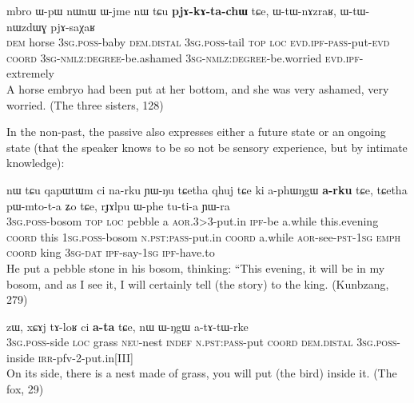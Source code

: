 \documentclass[oldfontcommands,oneside,a4paper,11pt]{memoir}
\newcommand{\ipa}[1]{{\phon #1}} %
\newcommand{\aor}{\textsc{aor}}
\newcommand{\coord}{\textsc{coord}}
\newcommand{\dat}{\textsc{dat}}
\newcommand{\dem}{\textsc{dem}}
\newcommand{\emphat}{\textsc{emph}}
\newcommand{\evd}{\textsc{evd}}
\newcommand{\indef}{\textsc{indef}}
\newcommand{\ipf}{\textsc{ipf}}
\newcommand{\irr}{\textsc{irr}}
\newcommand{\loc}{\textsc{loc}}
\newcommand{\neu}{\textsc{neu}}
\newcommand{\nmlz}{\textsc{nmlz}}
\newcommand{\npst}{\textsc{n.pst}}
\newcommand{\pass}{\textsc{pass}}
\newcommand{\poss}{\textsc{poss}}
\newcommand{\pst}{\textsc{pst}}
\newcommand{\sg}{\textsc{sg}}
\newcommand{\topic}{\textsc{top}}
\begin{document}
\begin{exe}
\ex
\gll   \ipa{nɯ} 	\ipa{mbro} 	\ipa{ɯ-pɯ} 	\ipa{nɯnɯ} 	\ipa{ɯ-jme} 	\ipa{nɯ} 	\ipa{tɕu} 	\textbf{\ipa{pjɤ-kɤ-ta-chɯ}} 	\ipa{tɕe,} 	\ipa{ɯ-tɯ-nɤzraʁ,} 	\ipa{ɯ-tɯ-nɯzdɯɣ} 	\ipa{pjɤ-saχaʁ}     \\
 \dem{} horse 3\sg{}.\poss{}-baby \dem{}.\textsc{distal}  3\sg{}.\poss{}-tail \topic{} \loc{} \evd.\ipf{}-\pass{}-put-\evd{} \coord{} 3\sg{}-\nmlz{}:\textsc{degree}-be.ashamed 3\sg{}-\nmlz{}:\textsc{degree}-be.worried \evd.\ipf{}-extremely  \\
 \glt  A horse embryo had been put at her bottom, and she was very ashamed, very worried.  (The three sisters, 128)
\end{exe}  	 
 	 
 In the non-past, the passive also expresses either a future state or an ongoing state (that the speaker knows to be so not be sensory experience, but by intimate knowledge):
 
\begin{exe}
\ex
\gll      \ipa{ɯ-phɯŋgɯ} 	\ipa{nɯ} 	\ipa{tɕu} 	\ipa{qapɯtɯm} 	\ipa{ci} 	\ipa{na-rku} 	\ipa{ɲɯ-ŋu} 	\ipa{tɕetha} 	\ipa{qhuj} 	\ipa{tɕe} 	\ipa{ki} 	\ipa{a-phɯŋgɯ} 	\textbf{\ipa{a-rku}} 	\ipa{tɕe,} 	\ipa{tɕetha} 	\ipa{pɯ-mto-t-a} 	\ipa{ʑo} 	\ipa{tɕe,} 	\ipa{rɟɤlpu} 	\ipa{ɯ-phe} 	\ipa{tu-ti-a} 	\ipa{ɲɯ-ra}   \\
 3\sg{}.\poss{}-bosom \topic{} \loc{} pebble a \aor{}.3>3-put.in \ipf{}-be a.while this.evening \coord{} this  1\sg{}.\poss{}-bosom \npst{}:\pass{}-put.in \coord{}   a.while \aor{}-see-\pst{}-1\sg{} \emphat{} \coord{} king 3\sg{}-\dat{} \ipf{}-say-1\sg{} \ipf{}-have.to \\
 \glt   He put a pebble stone in his bosom, thinking: ``This evening, it will be in my bosom, and as I see it, I will certainly tell (the story) to the king. (Kunbzang, 279)
\end{exe} 
 
 \begin{exe}
\ex
\gll      \ipa{ɯ-rkɯ} 	\ipa{zɯ,} 	  	\ipa{xɕɤj} 	\ipa{tɤ-loʁ} 	\ipa{ci} 	\textbf{\ipa{a-ta}} 	\ipa{tɕe,} 	\ipa{nɯ} 	\ipa{ɯ-ŋgɯ} 	\ipa{a-tɤ-tɯ-rke}  \\
 3\sg{}.\poss{}-side \loc{} grass \neu{}-nest \indef{} \npst{}:\pass{}-put \coord{} \dem{}.\textsc{distal}  3\sg{}.\poss{}-inside \irr{}-pfv-2-put.in[III] \\
 \glt On its side, there is a nest made of grass, you will put (the bird) inside it.    (The fox, 29)
\end{exe} 
  
\end{document}
